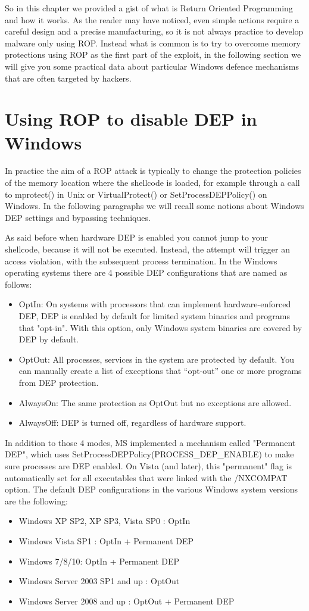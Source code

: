 \documentclass[Lau,binding=0.6cm]{sapthesis}
\begin{document}
So in this chapter we provided a gist of what is Return Oriented Programming and how it works. As the reader may have noticed, even simple actions require a careful design and a precise manufacturing, so it is not always practice to develop malware only using ROP. Instead what is common is to try to overcome memory protections using ROP as the first part of the exploit, in the following section we will give you some practical data about particular Windows defence mechanisms that are often targeted by hackers.


\section{Using ROP to disable DEP in Windows}

In practice the aim of a ROP attack is typically to change the protection policies of the memory location where the shellcode is loaded, for example through a call to mprotect() in Unix or VirtualProtect() or SetProcessDEPPolicy() on Windows. In the following paragraphs we will recall some notions about Windows DEP settings and bypassing techniques.

As said before when hardware DEP is enabled you cannot jump to your shellcode, because it will not be executed. Instead, the attempt will trigger an access violation, with the subsequent process termination.
In the Windows operating systems there are 4 possible DEP configurations that are named as follows:
\begin{itemize}
\item
OptIn: On systems with processors that can implement hardware-enforced DEP, DEP is enabled by default for limited system binaries and programs that "opt-in". With this option, only Windows system binaries are covered by DEP by default. 
\item
OptOut: All processes, services in the system are protected by default. You can manually create a list of  exceptions that “opt-out” one or more programs from DEP protection.
\item
AlwaysOn: The same protection as OptOut but no exceptions are allowed.
\item
AlwaysOff: DEP is turned off, regardless of hardware support.
\end{itemize}

In addition to those 4 modes, MS implemented a mechanism called "Permanent DEP", which uses SetProcessDEPPolicy(PROCESS\_DEP\_ENABLE) to make sure processes are DEP enabled. On Vista (and later), this "permanent" flag is automatically set for all executables that were linked with the /NXCOMPAT option.
The default DEP configurations in the various Windows system versions are the following:
\begin{itemize}
\item Windows XP SP2, XP SP3, Vista SP0 : OptIn
\item Windows Vista SP1 : OptIn + Permanent DEP
\item Windows 7/8/10: OptIn + Permanent DEP
\item Windows Server 2003 SP1 and up : OptOut
\item Windows Server 2008 and up : OptOut + Permanent DEP
\end{itemize}
\end{document}
